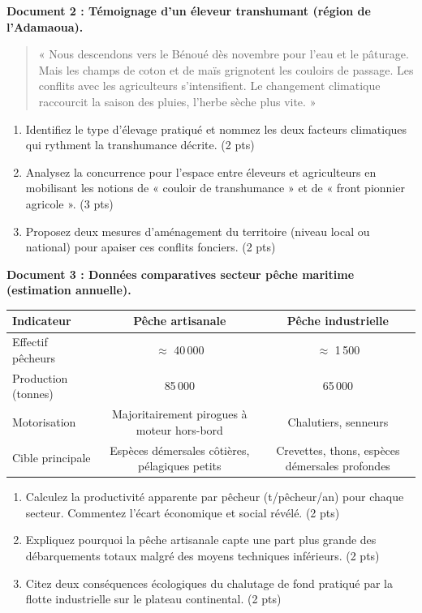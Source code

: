 \documentclass[11pt]{article}
\begin{document}
\begin{exercice}
\textbf{Document 2 : Témoignage d'un éleveur transhumant (région de l'Adamaoua).}
\begin{quote}
« Nous descendons vers le Bénoué dès novembre pour l'eau et le pâturage. Mais les champs de coton et de maïs grignotent les couloirs de passage. Les conflits avec les agriculteurs s'intensifient. Le changement climatique raccourcit la saison des pluies, l'herbe sèche plus vite. »
\end{quote}

\begin{enumerate}
    \item Identifiez le type d'élevage pratiqué et nommez les deux facteurs climatiques qui rythment la transhumance décrite. \hfill (2 pts)
    \item Analysez la concurrence pour l'espace entre éleveurs et agriculteurs en mobilisant les notions de « couloir de transhumance » et de « front pionnier agricole ». \hfill (3 pts)
    \item Proposez deux mesures d'aménagement du territoire (niveau local ou national) pour apaiser ces conflits fonciers. \hfill (2 pts)
\end{enumerate}
\end{exercice}

\begin{exercice}
\textbf{Document 3 : Données comparatives secteur pêche maritime (estimation annuelle).}

\begin{tabularx}{\linewidth}{>{\raggedright\arraybackslash}Xcc}
\toprule
\textbf{Indicateur} & \textbf{Pêche artisanale} & \textbf{Pêche industrielle} \\
\midrule
Effectif pêcheurs & $\approx$ 40\,000 & $\approx$ 1\,500 \\
Production (tonnes) & 85\,000 & 65\,000 \\
Motorisation & Majoritairement pirogues à moteur hors-bord & Chalutiers, senneurs \\
Cible principale & Espèces démersales côtières, pélagiques petits & Crevettes, thons, espèces démersales profondes \\
\bottomrule
\end{tabularx}

\begin{enumerate}
    \item Calculez la productivité apparente par pêcheur (t/pêcheur/an) pour chaque secteur. Commentez l'écart économique et social révélé. \hfill (2 pts)
    \item Expliquez pourquoi la pêche artisanale capte une part plus grande des débarquements totaux malgré des moyens techniques inférieurs. \hfill (2 pts)
    \item Citez deux conséquences écologiques du chalutage de fond pratiqué par la flotte industrielle sur le plateau continental. \hfill (2 pts)
\end{enumerate}
\end{exercice}
\end{document}
